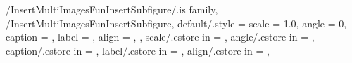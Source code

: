 {
} %

\pgfkeys
{
  /InsertMultiImagesFunInsertSubfigure/.is family, /InsertMultiImagesFunInsertSubfigure,
  default/.style = 
  {
    scale = 1.0,
    angle = 0,
    caption = \empty,
    label = \empty,
    align = \empty,
  },
  scale/.estore in = \InsertMultiImagesFunInsertSubfigureValueScale,
  angle/.estore in = \InsertMultiImagesFunInsertSubfigureValueAngle,
  caption/.estore in = \InsertMultiImagesFunInsertSubfigureValueCaption,
  label/.estore in = \InsertMultiImagesFunInsertSubfigureValueLabel,
  align/.estore in = \InsertMultiImagesFunInsertSubfigureValueAlign,
} %

\newcommand{\InsertMultiImagesFunInsertSubfigure}[2][\empty]
{
  \SetWidthOfImagePerRow
  \pgfkeys{/InsertMultiImagesFunInsertSubfigure, default, #1}
  \begin{subfigure}{\WidthOfImagePerRow\textwidth}
    \center
    \includegraphics[
      scale=\InsertMultiImagesFunInsertSubfigureValueScale,
      angle=\InsertMultiImagesFunInsertSubfigureValueAngle]
      {#2}
    \SetImageCaption{\InsertMultiImagesFunInsertSubfigureValueCaption}
    \ifthenelse{\equal{
      \InsertMultiImagesFunInsertSubfigureValueCaption}{\empty}}
      {}{\SetImageLabel{\InsertMultiImagesFunInsertSubfigureValueLabel}}
  \end{subfigure}%
} %

